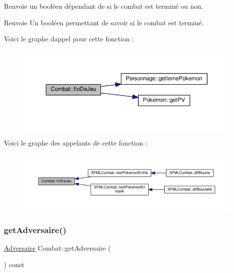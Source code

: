 Renvoie un booléen dépendant de si le combat est terminé ou non. \begin{DoxyReturn}{Renvoie}
Un booléen permettant de savoir si le combat est terminé. 
\end{DoxyReturn}
Voici le graphe d\textquotesingle{}appel pour cette fonction \+:\nopagebreak
\begin{figure}[H]
\begin{center}
\leavevmode
\includegraphics[width=350pt]{class_combat_abbaadce2f31d9b12645481cc74a021b2_cgraph}
\end{center}
\end{figure}
Voici le graphe des appelants de cette fonction \+:\nopagebreak
\begin{figure}[H]
\begin{center}
\leavevmode
\includegraphics[width=350pt]{class_combat_abbaadce2f31d9b12645481cc74a021b2_icgraph}
\end{center}
\end{figure}
\mbox{\label{class_combat_a018644148fc62da9c8abfafc166713c4}} 
\subsubsection{\texorpdfstring{get\+Adversaire()}{getAdversaire()}}
{\footnotesize\ttfamily \hyperlink{class_adversaire}{Adversaire} Combat\+::get\+Adversaire (\begin{DoxyParamCaption}{ }\end{DoxyParamCaption}) const}



